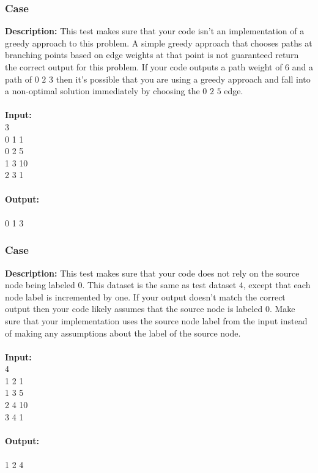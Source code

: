 \documentclass{article}
\newcommand{\code}[1]{{\fontfamily{pcr}\selectfont #1}}
\begin{document}
\subsubsection*{Case }
\hline \vspace{5}
\textbf{Description:} This test makes sure that your code isn’t an implementation of a greedy approach to this problem. A simple greedy approach that chooses paths at branching points based on edge weights at that point is not guaranteed return the correct output for this problem. If your code outputs a path weight of $6$ and a path of $0$ $2$ $3$ then it’s possible that you are using a greedy approach and fall into a non-optimal solution immediately by choosing the $0$ $2$ $5$ edge.\\ \\
\noindent \textbf{Input:}\\
\code{0 3\\0 1 1\\0 2 5\\1 3 10\\2 3 1}\\ \\
\noindent \textbf{Output:}\\
\code{11\\0 1 3}
\pagebreak

\subsubsection*{Case }
\hline \vspace{5}
\textbf{Description:} This test makes sure that your code does not rely on the source node being labeled $0$. This dataset is the same as test dataset $4$, except that each node label is incremented by one. If your output doesn’t match the correct output then your code likely assumes that the source node is labeled $0$. Make sure that your implementation uses the source node label from the input instead of making any assumptions about the label of the source node.\\ \\
\noindent \textbf{Input:}\\
\code{1 4\\1 2 1\\1 3 5\\2 4 10\\3 4 1}\\ \\
\noindent \textbf{Output:}\\
\code{11\\1 2 4}
\end{document}
